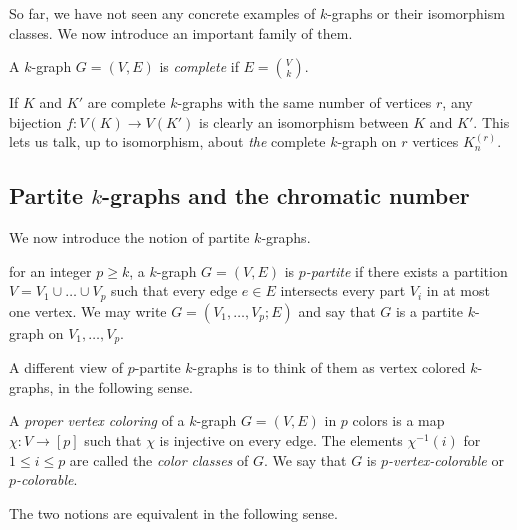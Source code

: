 So far, we have not seen any concrete examples of $k$-graphs or their isomorphism classes.
We now introduce an important family of them.

\begin{definition} \label{def:complete}
    A $k$-graph $G = (V, E)$ is \emph{complete} if $E = \binom{V}{k}$.
\end{definition}

If $K$ and $K'$ are complete $k$-graphs with the same number of vertices $r$,
any bijection $f: V(K) \to V(K')$ is clearly an isomorphism between $K$ and $K'$.
This lets us talk, up to isomorphism, about \emph{the} complete $k$-graph on $r$ vertices $K_n^{(r)}$.


\subsection{Partite $k$-graphs and the chromatic number}\label{subsec:partite}

We now introduce the notion of partite $k$-graphs.

\begin{definition} \label{def:partite}
    for an integer $p \geq k$, a $k$-graph $G = (V, E)$ is \emph{$p$-partite}
    if there exists a partition $V = V_1 \cup \dots \cup V_p$
    such that every edge $e \in E$ intersects every part $V_i$ in at most one vertex.
    We may write $G = (V_1, \dots, V_p; E)$ and say that
    $G$ is a partite $k$-graph on $V_1, \dots, V_p$.
\end{definition}

A different view of $p$-partite $k$-graphs is to think of them as vertex colored $k$-graphs,
in the following sense.

\begin{definition}
    A \emph{proper vertex coloring} of a $k$-graph $G = (V, E)$ in $p$ colors
    is a map $\chi: V \to [p]$ such that $\chi$ is injective on every edge.
    The elements $\chi^{-1}(i)$ for $1 \leq i \leq p$ are called the \emph{color classes} of $G$.
    We say that $G$ is \emph{$p$-vertex-colorable} or \emph{$p$-colorable}.
\end{definition}

The two notions are equivalent in the following sense.

